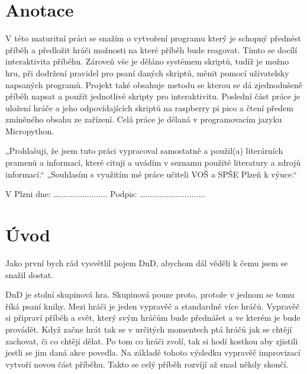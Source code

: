 \documentclass[12pt,a4paper]{article}
\begin{document}



\newpage

\section*{Anotace}
V této maturitní práci se snažím o vytvoření programu který je schopný přednést příběh a předložit hráči možnosti na které příběh bude reagovat. Tímto se docílí interaktivita příběhu. Zároveň vše je děláno systémem skriptů, tudíž je možno hru, při dodržení pravidel pro psaní daných skriptů, měnit pomocí uživatelsky napsaných programů. Projekt také obsahuje metodu se kterou se dá zjednodušeně příběh napsat a použít jednotlivé skripty pro interaktivitu. Poslední část práce je uložení hráče a jeho odpovídajících skriptů na raspberry pi pico a čtení předem zmíněného obsahu ze zařízení. Celá práce je dělaná v programovacím jazyku Micropython.


\vspace*{\fill}

„Prohlašuji, že jsem tuto práci vypracoval samostatně a použil(a) literárních pramenů a informací, které cituji a uvádím v seznamu použité literatury a zdrojů informací.“ 
„Souhlasím s využitím mé práce učiteli VOŠ a SPŠE Plzeň k výuce.“ 
\begin{flushright}
	V Plzni dne: …..................... Podpis: …..........................
\end{flushright} 

\newpage
\tableofcontents
\newpage

\section*{Úvod}
Jako první bych rád vysvětlil pojem DnD, abychom dál věděli k čemu jsem se snažil dostat. 

DnD je stolní skupinová hra. Skupinová pouze proto, protože v jednom se tomu říká psaní knihy. Mezi hráči je jeden vypravěč a standardně více hráčů. Vypravěč si připraví příběh a svět, který svým hráčům bude přednášet a ve kterém je bude provádět. Když začne hrát tak se v určitých momentech ptá hráčů jak se chtějí zachovat, či co chtějí dělat. Po tom co hráči zvolí, tak si hodí kostkou aby zjistili jestli se jim daná akce povedla. Na základě tohoto výsledku vypravěč improvizací vytvoří novou část příběhu. Takto se celý příběh rozvíjí až snad někdy skončí.
\end{document}
